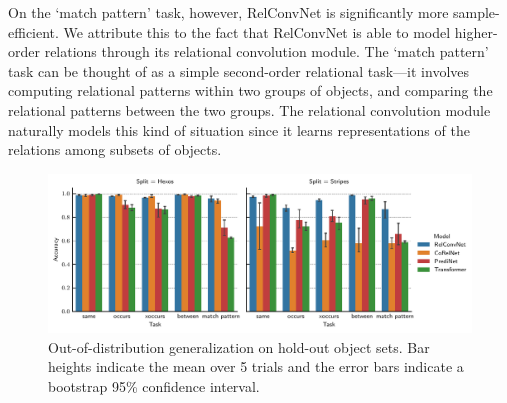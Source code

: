 On the `match pattern' task, however, RelConvNet is significantly more sample-efficient. We attribute this to the fact that RelConvNet is able to model higher-order relations through its relational convolution module. The `match pattern' task can be thought of as a simple second-order relational task---it involves computing relational patterns within two groups of objects, and comparing the relational patterns between the two groups. The relational convolution module naturally models this kind of situation since it learns representations of the relations among subsets of objects. %
\begin{figure}[ht]
    \vskip-15pt
    \centering
    \includegraphics[width=\textwidth]{figs/experiments/relgames_ood_acc.pdf}
    \vskip-5pt
    \caption{Out-of-distribution generalization on hold-out object sets. Bar heights indicate the mean over 5 trials and the error bars indicate a bootstrap 95\% confidence interval.}\label{fig:ood_generalization}
    \vskip-15pt
\end{figure}


